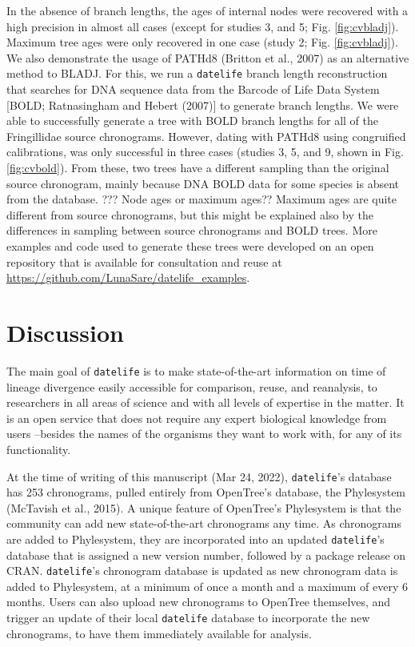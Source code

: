 \documentclass[
  english,
  man]{apa6}
\begin{document}
In the absence of branch lengths, the ages of internal nodes were recovered with a high precision in almost all cases (except for studies 3, and 5; Fig. \ref{fig:cvbladj}).
Maximum tree ages were only recovered in one case (study 2; Fig. \ref{fig:cvbladj}).
We also demonstrate the usage of PATHd8 (Britton et al., 2007) as an alternative method to BLADJ. For this, we run a \texttt{datelife} branch length reconstruction that searches for DNA sequence data from the Barcode of Life Data System {[}BOLD; Ratnasingham and Hebert (2007){]} to generate branch lengths. We were able to successfully generate a tree with BOLD branch lengths for all of the Fringillidae source chronograms. However, dating with PATHd8 using congruified calibrations, was only successful in
three cases (studies 3, 5, and 9, shown in Fig. \ref{fig:cvbold}).
From these, two trees have a different sampling than the original source chronogram, mainly because DNA BOLD data for some species is absent from the database.
??? Node ages or maximum ages?? Maximum ages are quite different from source chronograms, but this might be explained also by the differences in sampling between source chronograms and BOLD trees.
More examples and code used to generate these trees were developed on an open repository that is available for consultation and reuse at \url{https://github.com/LunaSare/datelife_examples}.

\hypertarget{discussion}{%
\section{Discussion}\label{discussion}}

The main goal of \texttt{datelife} is to make state-of-the-art information on time of lineage divergence easily accessible for comparison, reuse, and reanalysis, to researchers in all areas of science and with all levels of expertise in the matter. It is an open service that does not require any expert biological knowledge from users --besides the names of the organisms they want to work with, for any of its functionality.

At the time of writing of this manuscript (Mar 24, 2022), \texttt{datelife}'s database has 253 chronograms, pulled entirely from OpenTree's database, the Phylesystem (McTavish et al., 2015). A unique feature of OpenTree's Phylesystem is that the community can add new state-of-the-art chronograms any time. As chronograms are added to Phylesystem, they are incorporated into an updated \texttt{datelife}'s database that is assigned a new version number, followed by a package release on CRAN. \texttt{datelife}'s chronogram database is updated as new chronogram data is added to Phylesystem, at a minimum of once a month and a maximum of every 6 months.
Users can also upload new chronograms to OpenTree themselves, and trigger an update of their local \texttt{datelife} database to incorporate the new chronograms, to have them immediately available for analysis.
\end{document}
